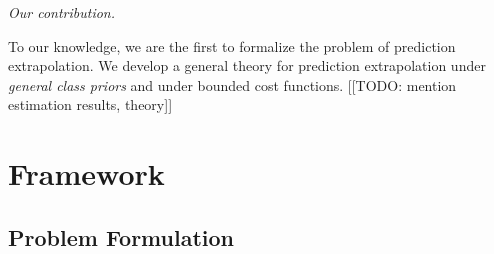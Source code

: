 \documentclass[12pt]{article}
\begin{document}
\noindent\emph{Our contribution.}

To our knowledge, we are the first to formalize the problem of
prediction extrapolation.  We develop a general theory for prediction
extrapolation under \emph{general class priors} and under bounded cost
functions.  [[TODO: mention estimation results, theory]]







\section{Framework}\label{sec:formulation}

\subsection{Problem Formulation}


\end{document}
